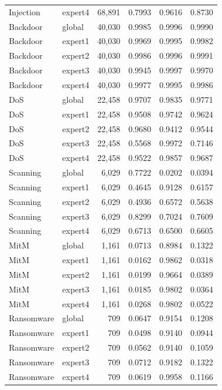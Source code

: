 \begin{longtable}{llrrrr}
Injection & expert4 & 68,891 & 0.7993 & 0.9616 & 0.8730 \\
Backdoor & global & 40,030 & 0.9985 & 0.9996 & 0.9990 \\
Backdoor & expert1 & 40,030 & 0.9969 & 0.9995 & 0.9982 \\
Backdoor & expert2 & 40,030 & 0.9986 & 0.9996 & 0.9991 \\
Backdoor & expert3 & 40,030 & 0.9945 & 0.9997 & 0.9970 \\
Backdoor & expert4 & 40,030 & 0.9977 & 0.9995 & 0.9986 \\
DoS & global & 22,458 & 0.9707 & 0.9835 & 0.9771 \\
DoS & expert1 & 22,458 & 0.9508 & 0.9742 & 0.9624 \\
DoS & expert2 & 22,458 & 0.9680 & 0.9412 & 0.9544 \\
DoS & expert3 & 22,458 & 0.5568 & 0.9972 & 0.7146 \\
DoS & expert4 & 22,458 & 0.9522 & 0.9857 & 0.9687 \\
Scanning & global & 6,029 & 0.7722 & 0.0202 & 0.0394 \\
Scanning & expert1 & 6,029 & 0.4645 & 0.9128 & 0.6157 \\
Scanning & expert2 & 6,029 & 0.4936 & 0.6572 & 0.5638 \\
Scanning & expert3 & 6,029 & 0.8299 & 0.7024 & 0.7609 \\
Scanning & expert4 & 6,029 & 0.6713 & 0.6500 & 0.6605 \\
MitM & global & 1,161 & 0.0713 & 0.8984 & 0.1322 \\
MitM & expert1 & 1,161 & 0.0162 & 0.9862 & 0.0318 \\
MitM & expert2 & 1,161 & 0.0199 & 0.9664 & 0.0389 \\
MitM & expert3 & 1,161 & 0.0185 & 0.9802 & 0.0364 \\
MitM & expert4 & 1,161 & 0.0268 & 0.9802 & 0.0522 \\
Ransomware & global & 709 & 0.0647 & 0.9154 & 0.1208 \\
Ransomware & expert1 & 709 & 0.0498 & 0.9140 & 0.0944 \\
Ransomware & expert2 & 709 & 0.0562 & 0.9140 & 0.1059 \\
Ransomware & expert3 & 709 & 0.0712 & 0.9182 & 0.1322 \\
Ransomware & expert4 & 709 & 0.0619 & 0.9958 & 0.1166 \\
\bottomrule
\end{longtable}
